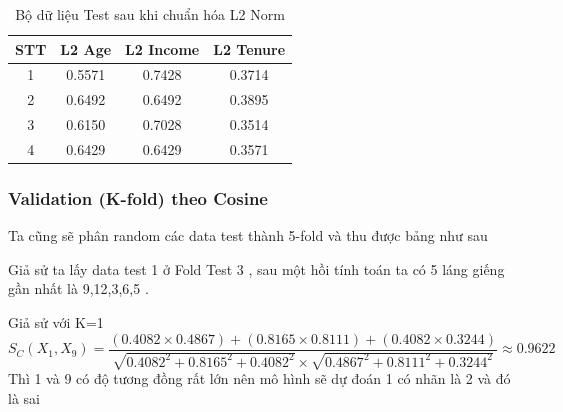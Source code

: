 \documentclass[12pt,a4paper]{article}
\begin{document}
\begin{table}[h]
\centering
\begin{tabular}{|c|c|c|c|}
\hline
\textbf{STT} & \textbf{L2 Age} & \textbf{L2 Income} & \textbf{L2 Tenure} \\ \hline
1 & 0.5571 & 0.7428 & 0.3714 \\ \hline
2 & 0.6492 & 0.6492 & 0.3895 \\ \hline
3 & 0.6150 & 0.7028 & 0.3514 \\ \hline
4 & 0.6429 & 0.6429 & 0.3571 \\ \hline
\end{tabular}
\caption{Bộ dữ liệu Test sau khi chuẩn hóa L2 Norm}
\end{table}
\subsubsection{Validation (K-fold) theo Cosine}
Ta cũng sẽ phân random các data test thành 5-fold và thu được bảng như sau

Giả sử ta lấy data test 1 ở Fold Test 3 , sau một hồi tính toán ta có 5 láng giếng gần nhất là 9,12,3,6,5 .

Giả sử với K=1
\[
S_C(X_1,X_9)=\frac{(0.4082 \times 0.4867) + (0.8165 \times 0.8111) + (0.4082 \times 0.3244)}{\sqrt{0.4082^2+0.8165^2+0.4082^2} \times \sqrt{0.4867^2+0.8111^2+0.3244^2}}\approx 0.9622
\]
Thì 1 và 9 có độ tương đồng rất lớn nên mô hình sẽ dự đoán 1 có nhãn là 2 và đó là sai 
\end{document}
